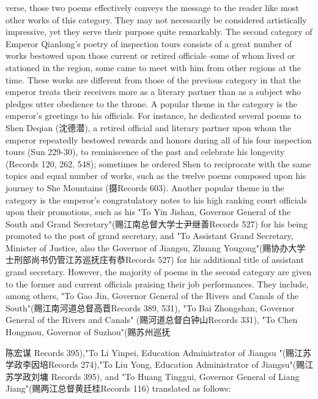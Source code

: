 \noindent verse, those two poems effectively conveys the message to the reader like most other works of this category. They may not necessarily be considered artistically impressive, yet they serve their purpose quite remarkably. The second category of Emperor Qianlong's poetry of inspection tours consists of a great number of works bestowed upon those current or retired officials--some of whom lived or stationed in the region, some came to meet with him from other regions at the time. These works are different from those of the previous category in that the emperor treats their receivers more as a literary partner than as a subject who pledges utter obedience to the throne. A popular theme in the category is the emperor's greetings to his officials. For instance, he dedicated several poems to Shen Deqian (沈德潜), a retired official and literary partner upon whom the emperor repeatedly bestowed rewards and honors during all of his four inspection tours (Sun 229-30), to reminiscence of the past and celebrate his longevity (Records 120, 262, 548); sometimes he ordered Shen to reciprocate with the same topics and equal number of works, such as the twelve poems composed upon his journey to She Mountains (摄Records 603). Another popular theme in the category is the emperor's congratulatory notes to his high ranking court officials upon their promotions, such as his "To Yin Jishan, Governor General of the South and Grand Secretary"(赐江南总督大学士尹继善Records 527) for his being promoted to the post of grand secretary, and "To Assistant Grand Secretary, Minister of Justice, also the Governor of Jiangsu, Zhuang Yougong"(赐协办大学士刑部尚书仍管江苏巡抚庄有恭Records 527) for his additional title of assistant grand secretary. However, the majority of poems in the second category are given to the former and current officials praising their job performances. They include, among others, "To Gao Jin, Governor General of the Rivers and Canals of the South"(赐江南河道总督高晋Records 389, 531), "To Bai Zhongshan, Governor General of the Rivers and Canals" (赐河道总督白钟山Records 331), "To Chen Hongmou, Governor of Suzhou"(赐苏州巡抚


\noindent 陈宏谋 Records 395),"To Li Yinpei, Education Administrator of Jiangsu "(赐江苏学政李因培Records 274),"To Liu Yong, Education Administrator of Jiangsu"(赐江苏学政刘墉 Records 395), and "To Huang Tinggui, Governor General of Liang Jiang"(赐两江总督黄廷桂Records 116) translated as follows:

